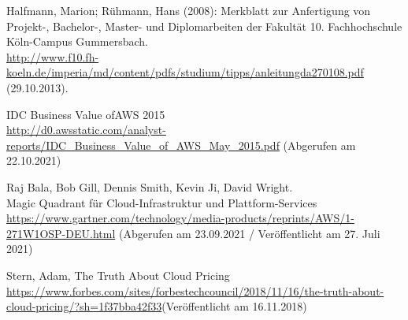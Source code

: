 \begin{thebibliography}{HR08}
   Halfmann, Marion; Rühmann, Hans (2008): Merkblatt zur Anfertigung von Projekt-, Bachelor-, Master- und Diplomarbeiten der Fakultät 10. Fachhochschule Köln-Campus Gummersbach. \\
  \url{http://www.f10.fh-koeln.de/imperia/md/content/pdfs/studium/tipps/anleitungda270108.pdf} (29.10.2013).

   IDC Business Value ofAWS 2015\\
 \url{http://d0.awsstatic.com/analyst-reports/IDC_Business_Value_of_AWS_May_2015.pdf}
 (Abgerufen am 22.10.2021)

  Raj Bala, Bob Gill, Dennis Smith, Kevin Ji, David Wright.\\ 
  Magic Quadrant für Cloud-Infrastruktur und Plattform-Services \\
  \url{https://www.gartner.com/technology/media-products/reprints/AWS/1-271W1OSP-DEU.html}
  (Abgerufen am 23.09.2021 / Veröffentlicht am 27. Juli 2021)


  Stern, Adam, The Truth About Cloud Pricing \\
  \url{https://www.forbes.com/sites/forbestechcouncil/2018/11/16/the-truth-about-cloud-pricing/?sh=1f37bba42f33}(Veröffentlicht am 16.11.2018)

  

  
\end{thebibliography}

